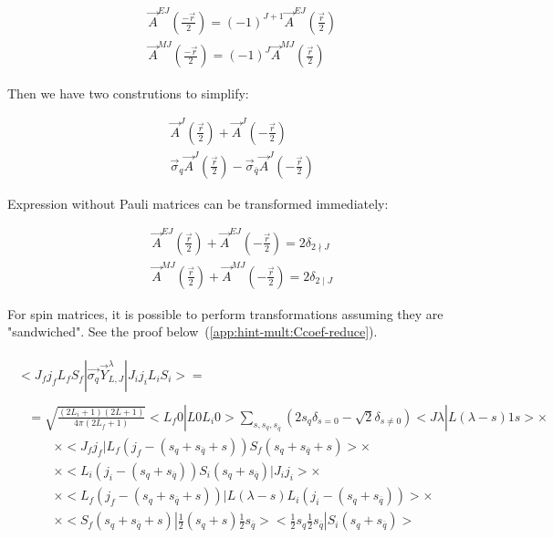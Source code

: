\begin{align}
    &\vec{A}^{EJ}(\frac{-\vec{r}}{2}) = (-1)^{J+1} \vec{A}^{EJ}(\frac{\vec{r}}{2}) \\
    &\vec{A}^{MJ}(\frac{-\vec{r}}{2}) = (-1)^{J} \vec{A}^{MJ}(\frac{\vec{r}}{2})
\end{align}

Then we have two construtions to simplify:

\begin{align}
    &\vec{A}^{J}(\frac{\vec{r}}{2}) + \vec{A}^{J}(-\frac{\vec{r}}{2}) \\
    &\vec{\sigma}_{q} \vec{A}^{J}(\frac{\vec{r}}{2}) - \vec{\sigma}_{\overline{q}} \vec{A}^{J}(-\frac{\vec{r}}{2}) \label{eq:sigmaAJ}
\end{align}

Expression without Pauli matrices can be transformed immediately:

\begin{align}
    &\vec{A}^{EJ}(\frac{\vec{r}}{2}) + \vec{A}^{EJ}(-\frac{\vec{r}}{2}) = 2 \delta_{2 \nmid J} \\
    &\vec{A}^{MJ}(\frac{\vec{r}}{2}) + \vec{A}^{MJ}(-\frac{\vec{r}}{2}) = 2 \delta_{2 \mid J}
\end{align}

For spin matrices, it is possible to perform transformations assuming they are "sandwiched". See the proof below~(\cref{app:hint-mult:Ccoef-reduce}).

\begin{align}
    \begin{split}
        <J_f j_f L_f S_f| \vec{\sigma_q} \vec{Y}_{L, J}^\lambda |J_i j_i L_i S_i> =
    \end{split} \\
    \begin{split}
        &= \sqrt{\frac{(2L_i + 1)(2L+1)}{4 \pi (2L_f + 1)}} < L_f 0 | L 0 L_i 0 > \sum_{s, s_{q}, s_{\overline{q}}} (2 s_q \delta_{s = 0} - \sqrt{2} \delta_{s \neq 0}) <J \lambda| L (\lambda - s) 1 s> \times\\
    &\qquad\times <J_f j_f| L_f (j_f-(s_q + s_{\overline{q}} + s)) S_f (s_q + s_{\overline{q}} + s)> \times \\
        &\qquad\times <L_i (j_i - (s_q + s_{\overline{q}})) S_i (s_q + s_{\overline{q}})| J_i j_i> \times \\
        &\qquad\times <L_f (j_f - (s_q + s_{\overline{q}} + s))| L (\lambda - s) L_i (j_i - (s_q + s_{\overline{q}}))>  \times\\
        &\qquad\times <S_f (s_q + s_{\overline{q}} + s)| \frac{1}{2} (s_{q}+s) \frac{1}{2} s_{\overline{q}}> <\frac{1}{2} s_{q} \frac{1}{2} s_{\overline{q}} |S_i (s_q + s_{\overline{q}})>
    \end{split}
\end{align}

